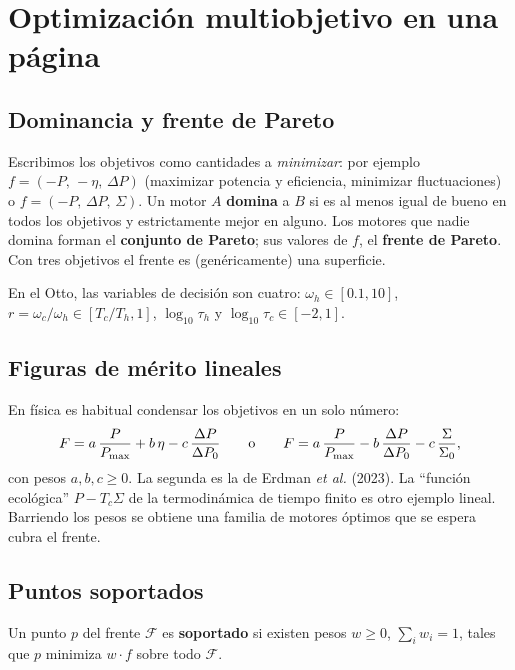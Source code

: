 \section{Optimización multiobjetivo en una página}

\subsection{Dominancia y frente de Pareto}

Escribimos los objetivos como cantidades a \emph{minimizar}: por ejemplo
$f = (-P,\,-\eta,\,\Delta P)$ (maximizar potencia y eficiencia, minimizar fluctuaciones) o
$f = (-P,\,\Delta P,\,\Sigma)$. Un motor $A$ \textbf{domina} a $B$ si es al menos igual de bueno en
todos los objetivos y estrictamente mejor en alguno. Los motores que nadie domina forman el
\textbf{conjunto de Pareto}; sus valores de $f$, el \textbf{frente de Pareto}. Con tres objetivos
el frente es (genéricamente) una superficie.

En el Otto, las variables de decisión son cuatro: $\omega_h\in[0.1,10]$, $r = \omega_c/\omega_h \in
[T_c/T_h, 1]$, $\log_{10}\tau_h$ y $\log_{10}\tau_c \in [-2, 1]$.

\subsection{Figuras de mérito lineales}

En física es habitual condensar los objetivos en un solo número:
\begin{equation}
F = a\,\frac{P}{P_{\max}} + b\,\eta - c\,\frac{\Delta P}{\Delta P_0}
\qquad\text{o}\qquad
F = a\,\frac{P}{P_{\max}} - b\,\frac{\Delta P}{\Delta P_0} - c\,\frac{\Sigma}{\Sigma_0},
\end{equation}
con pesos $a,b,c\ge0$. La segunda es la de Erdman \emph{et al.} (2023). La ``función ecológica''
$P - T_c\Sigma$ de la termodinámica de tiempo finito es otro ejemplo lineal. Barriendo los pesos se
obtiene una familia de motores óptimos que se espera cubra el frente.

\subsection{Puntos soportados}

\begin{definicion}
Un punto $p$ del frente $\mathcal{F}$ es \textbf{soportado} si existen pesos $w\ge0$,
$\sum_i w_i = 1$, tales que $p$ minimiza $w\cdot f$ sobre todo $\mathcal{F}$.
\end{definicion}

